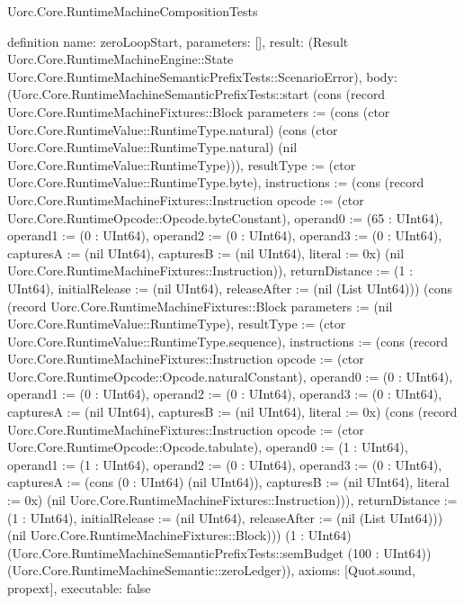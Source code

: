 \begin{lexlean}{Uorc.Core.RuntimeMachineCompositionTests}
\begin{semanticmodule}
definition{
  name: zeroLoopStart,
  parameters: [],
  result: (Result Uorc.Core.RuntimeMachineEngine::State Uorc.Core.RuntimeMachineSemanticPrefixTests::ScenarioError),
  body: (Uorc.Core.RuntimeMachineSemanticPrefixTests::start (cons (record Uorc.Core.RuntimeMachineFixtures::Block {parameters := (cons (ctor Uorc.Core.RuntimeValue::RuntimeType.natural) (cons (ctor Uorc.Core.RuntimeValue::RuntimeType.natural) (nil Uorc.Core.RuntimeValue::RuntimeType))), resultType := (ctor Uorc.Core.RuntimeValue::RuntimeType.byte), instructions := (cons (record Uorc.Core.RuntimeMachineFixtures::Instruction {opcode := (ctor Uorc.Core.RuntimeOpcode::Opcode.byteConstant), operand0 := (65 : UInt64), operand1 := (0 : UInt64), operand2 := (0 : UInt64), operand3 := (0 : UInt64), capturesA := (nil UInt64), capturesB := (nil UInt64), literal := 0x}) (nil Uorc.Core.RuntimeMachineFixtures::Instruction)), returnDistance := (1 : UInt64), initialRelease := (nil UInt64), releaseAfter := (nil (List UInt64))}) (cons (record Uorc.Core.RuntimeMachineFixtures::Block {parameters := (nil Uorc.Core.RuntimeValue::RuntimeType), resultType := (ctor Uorc.Core.RuntimeValue::RuntimeType.sequence), instructions := (cons (record Uorc.Core.RuntimeMachineFixtures::Instruction {opcode := (ctor Uorc.Core.RuntimeOpcode::Opcode.naturalConstant), operand0 := (0 : UInt64), operand1 := (0 : UInt64), operand2 := (0 : UInt64), operand3 := (0 : UInt64), capturesA := (nil UInt64), capturesB := (nil UInt64), literal := 0x}) (cons (record Uorc.Core.RuntimeMachineFixtures::Instruction {opcode := (ctor Uorc.Core.RuntimeOpcode::Opcode.tabulate), operand0 := (1 : UInt64), operand1 := (1 : UInt64), operand2 := (0 : UInt64), operand3 := (0 : UInt64), capturesA := (cons (0 : UInt64) (nil UInt64)), capturesB := (nil UInt64), literal := 0x}) (nil Uorc.Core.RuntimeMachineFixtures::Instruction))), returnDistance := (1 : UInt64), initialRelease := (nil UInt64), releaseAfter := (nil (List UInt64))}) (nil Uorc.Core.RuntimeMachineFixtures::Block))) (1 : UInt64) (Uorc.Core.RuntimeMachineSemanticPrefixTests::semBudget (100 : UInt64)) (Uorc.Core.RuntimeMachineSemantic::zeroLedger)),
  axioms: [Quot.sound, propext],
  executable: false
}


\end{semanticmodule}
\end{lexlean}
